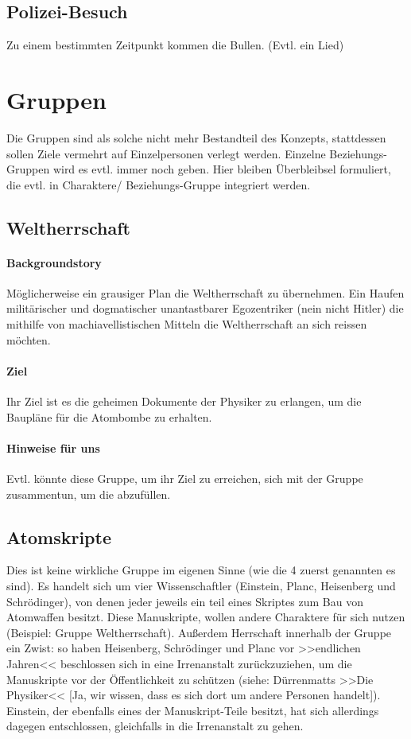 \documentclass[12pt, a4paper, openany]{report}
\begin{document}
\section{Polizei-Besuch}
Zu einem bestimmten Zeitpunkt kommen die Bullen. (Evtl. ein Lied)

\chapter{Gruppen}
Die Gruppen sind als solche nicht mehr Bestandteil des Konzepts, stattdessen sollen Ziele vermehrt auf Einzelpersonen verlegt werden. 
Einzelne Beziehungs-Gruppen wird es evtl. immer noch geben. 
Hier bleiben Überbleibsel formuliert, die evtl. in Charaktere/ Beziehungs-Gruppe integriert werden. 

\section{Weltherrschaft}
\subsubsection{Backgroundstory}
Möglicherweise ein grausiger Plan die Weltherrschaft zu übernehmen. 
Ein Haufen militärischer und dogmatischer unantastbarer Egozentriker (nein nicht Hitler) die mithilfe von machiavellistischen Mitteln die Weltherrschaft an sich reissen möchten. 

\subsubsection{Ziel}
Ihr Ziel ist es die geheimen Dokumente der Physiker zu erlangen, um die Baupläne für die Atombombe zu erhalten.

\subsubsection{Hinweise für uns}
Evtl. könnte diese Gruppe, um ihr Ziel zu erreichen, sich mit der Gruppe  zusammentun, um die abzufüllen.

\section{Atomskripte}
Dies ist keine wirkliche Gruppe im eigenen Sinne (wie die 4 zuerst genannten es sind). 
Es handelt sich um vier Wissenschaftler (Einstein, Planc, Heisenberg und Schrödinger), von denen jeder jeweils ein teil eines Skriptes zum Bau von Atomwaffen besitzt.
Diese Manuskripte, wollen andere Charaktere für sich nutzen (Beispiel: Gruppe Weltherrschaft).
Außerdem Herrschaft innerhalb der Gruppe ein Zwist: 
so haben Heisenberg, Schrödinger und Planc vor >>endlichen Jahren<< beschlossen sich in eine Irrenanstalt zurückzuziehen, um die Manuskripte vor der Öffentlichkeit zu schützen (siehe: Dürrenmatts >>Die Physiker<< [Ja, wir wissen, dass es sich dort um andere Personen handelt]).
Einstein, der ebenfalls eines der Manuskript-Teile besitzt, hat sich allerdings dagegen entschlossen, gleichfalls in die Irrenanstalt zu gehen.
\end{document}
